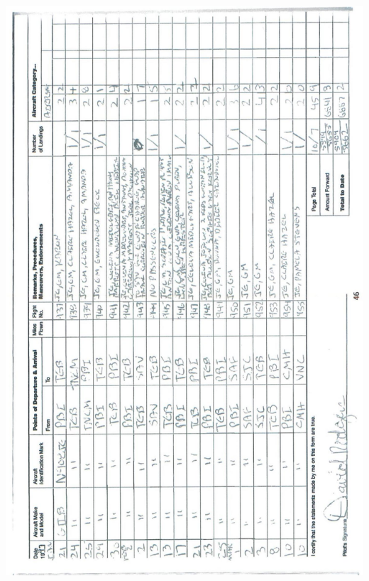 \documentclass[10pt]{article}
\begin{document}
\includegraphics[max width=\textwidth, center]{2025_02_27_dd68c3d38de88f0516d9g-050}\\
\end{document}
